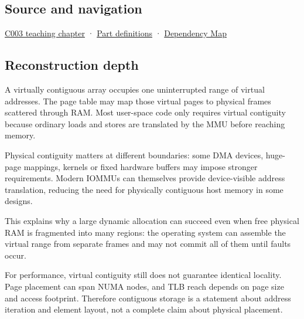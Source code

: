 \subsection{Source and navigation}\label{appendix-f897c1ddac8f-source-and-navigation}

\hyperref[01-foundations-i-ch002-where-the-bytes-live]{C003 teaching chapter} · \hyperref[appendix-fd090d982a15-m003---parts-41-60]{Part definitions} · \hyperref[appendix-4ad47bdd269a]{Dependency Map}

\subsection{Reconstruction depth}\label{appendix-f897c1ddac8f-reconstruction-depth}

A virtually contiguous array occupies one uninterrupted range of virtual addresses. The page table may map those virtual pages to physical frames scattered through RAM. Most user-space code only requires virtual contiguity because ordinary loads and stores are translated by the MMU before reaching memory.

Physical contiguity matters at different boundaries: some DMA devices, huge-page mappings, kernels or fixed hardware buffers may impose stronger requirements. Modern IOMMUs can themselves provide device-visible address translation, reducing the need for physically contiguous host memory in some designs.

This explains why a large dynamic allocation can succeed even when free physical RAM is fragmented into many regions: the operating system can assemble the virtual range from separate frames and may not commit all of them until faults occur.

For performance, virtual contiguity still does not guarantee identical locality. Page placement can span NUMA nodes, and TLB reach depends on page size and access footprint. Therefore contiguous storage is a statement about address iteration and element layout, not a complete claim about physical placement.
